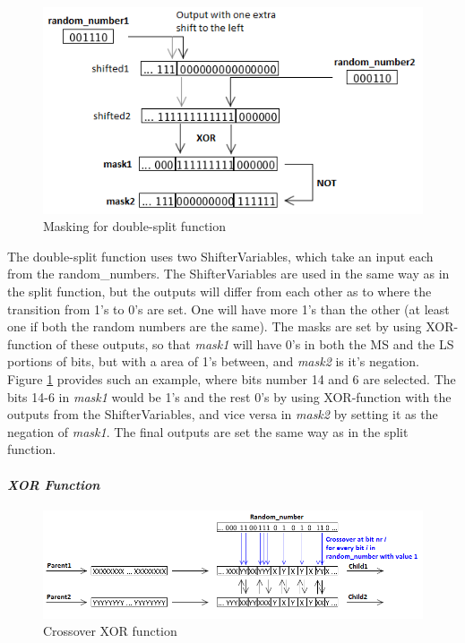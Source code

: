 \begin{figure}[H]
\includegraphics[width=\textwidth]{fpga/fig/crossover_doublesplit_mask2.png}
\caption{Masking for double-split function}
\label{fig_crossover_doublesplit_mask}
\end{figure}

The double-split function uses two ShifterVariables, which take an input each from the random\_numbers.
The ShifterVariables are used in the same way as in the split function, but the outputs will differ from each other as to where the transition from 1's to 0's are set.
One will have more 1's than the other (at least one if both the random numbers are the same).
The masks are set by using XOR-function of these outputs, so that \emph{mask1} will have 0's in both the MS and the LS portions of bits, but with a area of 1's between, and \emph{mask2} is it's negation.
Figure \ref{fig_crossover_doublesplit_mask} provides such an example, where bits number 14 and 6 are selected.
The bits 14-6 in \emph{mask1} would be 1's and the rest 0's by using XOR-function with the outputs from the ShifterVariables, and vice versa in \emph{mask2} by setting it as the negation of \emph{mask1}.
The final outputs are set the same way as in the split function.


\paragraph{\textit{XOR Function}}
\begin{figure}[H]
\includegraphics[width=\textwidth]{fpga/fig/crossover_xor.png}
\caption{Crossover XOR function}
\label{fig_crossover_xor}
\end{figure}

